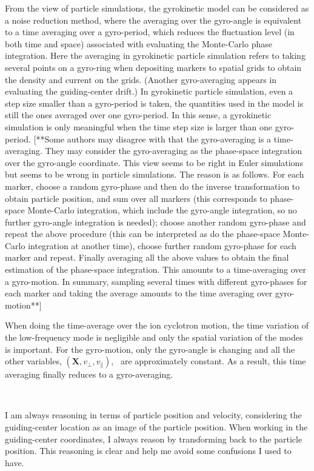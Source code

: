 \documentclass{llncs}
\begin{document}
From the view of particle simulations, the gyrokinetic model can be
considered as a noise reduction method, where the averaging over the
gyro-angle is equivalent to a time averaging over a gyro-period, which reduces
the fluctuation level (in both time and space) associated with evaluating the
Monte-Carlo phase integration. Here the averaging in gyrokinetic particle
simulation refers to taking several points on a gyro-ring when depositing
markers to spatial grids to obtain the density and current on the grids.
(Another gyro-averaging appears in evaluating the guiding-center drift.) In
gyrokinetic particle simulation, even a step size smaller than a gyro-period
is taken, the quantities used in the model is still the ones averaged over one
gyro-period. In this sense, a gyrokinetic simulation is only meaningful when
the time step size is larger than one gyro-period. [**Some authors may
disagree with that the gyro-averaging is a time-averaging. They may consider
the gyro-averaging as the phase-space integration over the gyro-angle
coordinate. This view seems to be right in Euler simulations but seems to be
wrong in particle simulations. The reason is as follows. For each marker,
choose a random gyro-phase and then do the inverse transformation to obtain
particle position, and sum over all markers (this corresponds to phase-space
Monte-Carlo integration, which include the gyro-angle integration, so no
further gyro-angle integration is needed); choose another random gyro-phase
and repeat the above procedure (this can be interpreted as do the phase-space
Monte-Carlo integration at another time), choose further random gyro-phase for
each marker and repeat. Finally averaging all the above values to obtain the
final estimation of the phase-space integration. This amounts to a
time-averaging over a gyro-motion. In summary, sampling several times with
different gyro-phases for each marker and taking the average amounts to the
time averaging over gyro-motion**]

When doing the time-average over the ion cyclotron motion, the time variation
of the low-frequency mode is negligible and only the spatial variation of the
modes is important. For the gyro-motion, only the gyro-angle is changing and
all the other variables, $(\mathbf{X}, v_{\perp}, v_{\parallel})$, \ are
approximately constant. As a result, this time averaging finally reduces to a
gyro-averaging.

\

I am always reasoning in terms of particle position and velocity, considering
the guiding-center location as an image of the particle position. When working
in the guiding-center coordinates, I always reason by transforming back to the
particle position. This reasoning is clear and help me avoid some confusions I
used to have.
\end{document}

